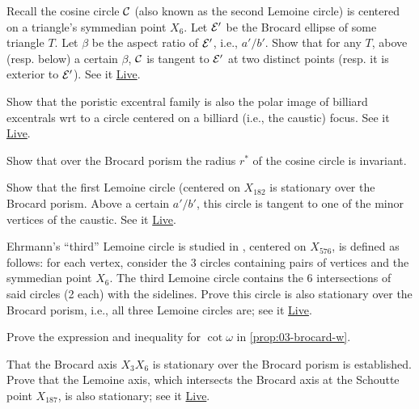 \begin{exercise}
Recall the cosine circle $\mathcal{C}$ (also known as the second Lemoine circle) is centered on a triangle's symmedian point $X_6$. Let $\mathcal{E}'$ be the Brocard ellipse of some triangle $T$. Let $\beta$ be the aspect ratio of $\mathcal{E}'$, i.e., $a'/b'$. Show that for any $T$, above (resp. below) a certain $\beta$, $\mathcal{C}$ is tangent to $\mathcal{E}'$ at two distinct points (resp. it is exterior to $\mathcal{E}'$). See it \href{https://bit.ly/2RqhUQV}{Live}.
\end{exercise}


\begin{exercise}
Show that the poristic excentral family is also the polar image of billiard excentrals wrt to a circle centered on a billiard (i.e., the caustic) focus. See it \href{https://bit.ly/33c1s9A}{Live}.
\end{exercise}

\begin{exercise}
Show that over the Brocard porism the radius $r^*$ of the cosine circle is invariant.
\end{exercise}

\begin{exercise}
Show that the first Lemoine circle (centered on $X_{182}$ is stationary over the Brocard porism. Above a certain $a'/b'$, this circle is tangent to one of the minor vertices of the caustic. See it \href{https://bit.ly/3tp0XUq}{Live}.
\end{exercise}

\begin{exercise}
Ehrmann's ``third'' Lemoine circle is studied in \cite{darij2012-ehrmann}, centered on $X_{576}$, is defined as follows: for each vertex, consider the 3 circles containing pairs of vertices and the symmedian point $X_6$. The third Lemoine circle contains the 6 intersections of said circles (2 each) with the sidelines. Prove this circle is also stationary over the Brocard porism, i.e., all three Lemoine circles are; see it \href{https://bit.ly/3tw09gA}{Live}. 
\end{exercise}


\begin{exercise}
Prove the expression and inequality for $\cot{\omega}$ in \cref{prop:03-brocard-w}.
\end{exercise}

\begin{exercise}
That the Brocard axis $X_3 X_6$ is stationary over the Brocard porism is established. Prove that the Lemoine axis, which intersects the Brocard axis at the Schoutte point $X_{187}$, is also stationary; see it \href{https://bit.ly/3nTRi75}{Live}.
\end{exercise}

